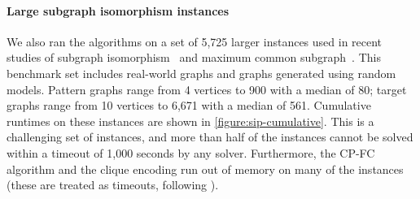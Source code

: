 \paragraph{Large subgraph isomorphism instances} We also ran the algorithms on
a set of 5,725 larger instances used in recent studies of subgraph
isomorphism~\citep{DBLP:conf/lion/KotthoffMS16} and maximum common
subgraph~\citep{UpcomingAAAIPaper}.  This benchmark set includes real-world
graphs and graphs generated using random models.  Pattern graphs range from 4
vertices to 900 with a median of 80; target graphs range from 10 vertices to
6,671 with a median of 561. Cumulative runtimes on these instances are shown in
\cref{figure:sip-cumulative}.  This is a challenging set of instances, and more
than half of the instances cannot be solved within a timeout of 1,000 seconds by
any solver. Furthermore, the CP-FC algorithm and the clique encoding run out of
memory on many of the instances (these are treated as timeouts, following
\citet{UpcomingAAAIPaper}).

